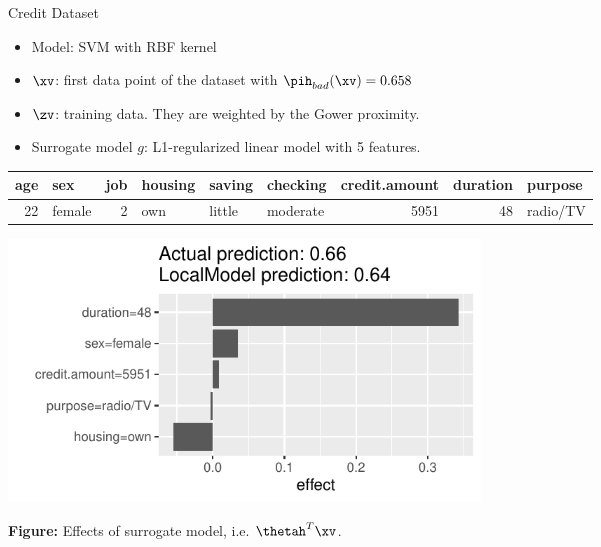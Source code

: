 \documentclass[11pt,compress,t,notes=noshow, aspectratio=169, xcolor=table]{beamer}
\begin{document}
\begin{vbframe}{Credit Dataset}
	\begin{itemize}
		\item Model: SVM with RBF kernel
		\item $\xv$: first data point of the dataset with $\pih_{bad}(\xv) = 0.658$
		\item $\zv$: training data. They are weighted by the Gower proximity. 
		\item Surrogate model $g$: L1-regularized linear model with 5 features. 
	\end{itemize}
\vspace{-0.5cm}
	\begin{table}[ht]
		\centering
		\scriptsize
		\begin{tabular}{rlrlllrrl}
			\hline
			age & sex & job & housing & saving & checking & credit.amount & duration & purpose \\ 
			\hline
			 22 & female &   2 & own & little & moderate & 5951 &  48 & radio/TV \\ 
			\hline
		\end{tabular}
	\end{table}
\vspace{-0.5cm}
\begin{center}
	\includegraphics[width=0.55\textwidth]{figure/lime_credit.pdf}
	
	\tiny{\textbf{Figure:} Effects of surrogate model, i.e. $\thetah^T \xv$.}
	
\end{center}


\end{vbframe}
\end{document}
